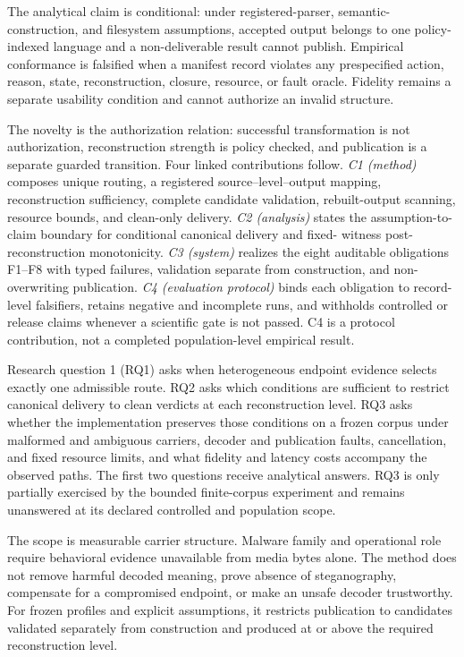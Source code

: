 The analytical claim is conditional: under registered-parser, semantic-
construction, and filesystem assumptions, accepted output belongs to one
policy-indexed language and a non-deliverable result cannot publish. Empirical
conformance is falsified when a manifest record violates any prespecified
action, reason, state, reconstruction, closure, resource, or fault oracle.
Fidelity remains a separate usability condition and cannot authorize an
invalid structure.

The novelty is the authorization relation: successful transformation is not
authorization, reconstruction strength is policy checked, and publication is a
separate guarded transition. Four linked contributions follow. \emph{C1
(method)} composes unique routing, a registered source--level--output mapping,
reconstruction sufficiency, complete candidate validation, rebuilt-output
scanning, resource bounds, and clean-only delivery. \emph{C2 (analysis)} states
the assumption-to-claim boundary for conditional canonical delivery and fixed-
witness post-reconstruction monotonicity. \emph{C3 (system)} realizes the eight
auditable obligations F1--F8 with typed failures, validation separate from
construction, and non-overwriting publication. \emph{C4 (evaluation protocol)}
binds each obligation to record-level falsifiers, retains negative and
incomplete runs, and withholds controlled or release claims whenever a
scientific gate is not passed. C4 is a protocol contribution, not a completed
population-level empirical result.

Research question 1 (RQ1) asks when heterogeneous endpoint evidence selects
exactly one admissible route. RQ2 asks which conditions are sufficient to
restrict canonical delivery to clean verdicts at each reconstruction level.
RQ3 asks whether the implementation preserves those conditions on a frozen
corpus under malformed
and ambiguous carriers, decoder and publication faults, cancellation, and fixed
resource limits, and what fidelity and latency costs accompany the observed
paths. The first two questions receive analytical answers. RQ3 is only
partially exercised by the bounded finite-corpus experiment and remains
unanswered at its declared controlled and population scope.

The scope is measurable carrier structure. Malware family and operational role
require behavioral evidence unavailable from media bytes alone. The method does
not remove harmful decoded meaning, prove absence of steganography, compensate
for a compromised endpoint, or make an unsafe decoder trustworthy. For frozen
profiles and explicit assumptions, it restricts publication to candidates
validated separately from construction and produced at or above the required
reconstruction level.
